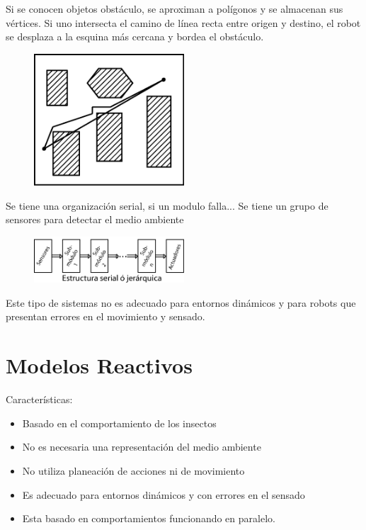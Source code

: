Si se conocen objetos obstáculo, se aproximan a polígonos y se almacenan sus vértices. Si uno intersecta el camino de línea recta entre origen y destino, el robot se desplaza a la esquina más cercana y bordea el obstáculo.

\begin{figure}[h!]
	\centering
	\includegraphics[width=0.5\textwidth]{images/img2.png}
\end{figure}

Se tiene una organización serial, si un modulo falla... 
Se tiene un grupo de sensores para detectar el medio ambiente

\begin{figure}[h!]
	\centering
	\includegraphics[width=0.5\textwidth]{images/img4.png}
	\label{figura4}
\end{figure}

Este tipo de sistemas no es adecuado para entornos dinámicos y para robots que presentan errores en el movimiento y sensado.



\section{Modelos Reactivos}


Características:

\begin{itemize}
	\item[\textbullet] Basado en el comportamiento de los insectos
	\item[\textbullet] No es necesaria una representación del medio ambiente
	\item[\textbullet] No utiliza planeación de acciones ni de movimiento
	\item[\textbullet] Es adecuado para entornos dinámicos y con errores en el sensado
	\item[\textbullet] Esta basado en comportamientos funcionando en paralelo.
\end{itemize}



